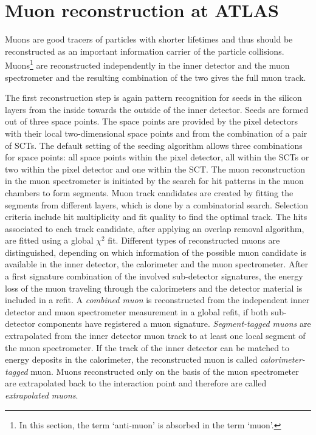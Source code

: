 \section{Muon reconstruction at ATLAS}\label{muReconstruction}
Muons are good tracers of particles with shorter lifetimes and thus should be reconstructed as an important information carrier of the particle collisions. Muons\footnote{In this section, the term `anti-muon' is absorbed in the term `muon'.} are reconstructed independently in the inner detector and the muon spectrometer and the resulting combination of the two gives the full muon track. \cite{muPerformance}\par
The first reconstruction step is again pattern recognition for seeds in the silicon layers from the inside towards the outside of the inner detector. Seeds are formed out of three space points. The space points are provided by the pixel detectors with their local two-dimensional space points and from the combination of a pair of SCTs. The default setting of the seeding algorithm allows three combinations for space points: all space points within the pixel detector, all within the SCTs or two within the pixel detector and one within the SCT. \cite{muInner}\newline
The muon reconstruction in the muon spectrometer is initiated by the search for hit patterns in the muon chambers to form segments. Muon track candidates are created by fitting the segments from different layers, which is done by a combinatorial search. Selection criteria include hit multiplicity and fit quality to find the optimal track. The hits associated to each track candidate, after applying an overlap removal algorithm, are fitted using a global $\chi^2$ fit. \cite{muPerformance}\newline
Different types of reconstructed muons are distinguished, depending on which information of the possible muon candidate is available in the inner detector, the calorimeter and the muon spectrometer. After a first signature combination of the involved sub-detector signatures, the energy loss of the muon traveling through the calorimeters and the detector material is included in a refit. A \textit{combined muon} is reconstructed from the independent inner detector and muon spectrometer measurement in a global refit, if both sub-detector components have registered a muon signature. \textit{Segment-tagged muons} are extrapolated from the inner detector muon track to at least one local segment of the muon spectrometer. If the track of the inner detector can be matched to energy deposits in the calorimeter, the reconstructed muon is called \textit{calorimeter-tagged} muon. Muons reconstructed only on the basis of the muon spectrometer are extrapolated back to the interaction point and therefore are called \textit{extrapolated muons}.\cite{muPerformance}\newline
